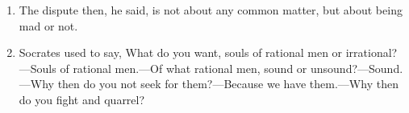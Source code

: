 \begin{enumerate}
\item The dispute then, he said, is not about any common matter, but about being mad or not.

\item Socrates used to say, What do you want, souls of rational men or irrational?—Souls of rational men.—Of what rational men, sound or unsound?—Sound.—Why then do you not seek for them?—Because we have them.—Why then do you fight and quarrel?
\end{enumerate}